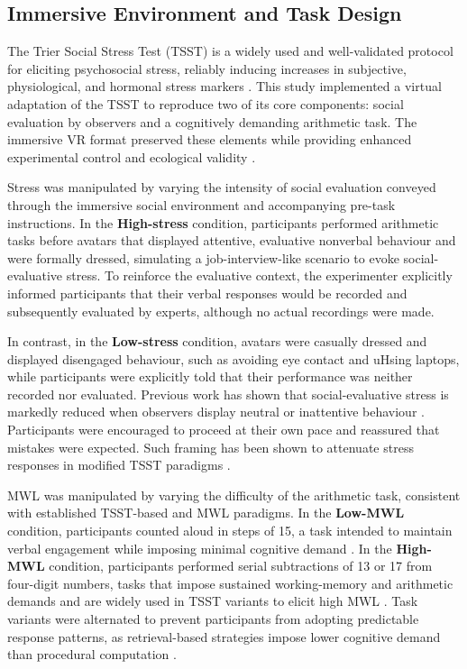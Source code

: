 \documentclass[lettersize,journal]{IEEEtran}
\begin{document}
\subsection{Immersive Environment and Task Design}
\label{sec:immersive_env_task}
The Trier Social Stress Test (TSST) is a widely used and well-validated protocol for eliciting psychosocial stress, reliably inducing increases in subjective, physiological, and hormonal stress markers \cite{goodmanMetaanalyticalAssessmentEffects2017, vanhollebekeNeuralCorrelatesPsychosocial2022a}. This study implemented a virtual adaptation of the TSST to reproduce two of its core components: social evaluation by observers and a cognitively demanding arithmetic task. The immersive VR format preserved these elements while providing enhanced experimental control and ecological validity \cite{helminenStressReactivityTrier2021}.

Stress was manipulated by varying the intensity of social evaluation conveyed through the immersive social environment and accompanying pre-task instructions. In the \textbf{High-stress} condition, participants performed arithmetic tasks before avatars that displayed attentive, evaluative nonverbal behaviour and were formally dressed, simulating a job-interview-like scenario to evoke social-evaluative stress. To reinforce the evaluative context, the experimenter explicitly informed participants that their verbal responses would be recorded and subsequently evaluated by experts, although no actual recordings were made. 

In contrast, in the \textbf{Low-stress} condition, avatars were casually dressed and displayed disengaged behaviour, such as avoiding eye contact and uHsing laptops, while participants were explicitly told that their performance was neither recorded nor evaluated. Previous work has shown that social-evaluative stress is markedly reduced when observers display neutral or inattentive behaviour \cite{yeImpactAudienceDynamics2024}. Participants were encouraged to proceed at their own pace and reassured that mistakes were expected. Such framing has been shown to attenuate stress responses in modified TSST paradigms \cite{wiemersFriendlyVersionTrier2013}.

MWL was manipulated by varying the difficulty of the arithmetic task, consistent with established TSST-based and MWL paradigms. In the \textbf{Low-MWL} condition, participants counted aloud in steps of 15, a task intended to maintain verbal engagement while imposing minimal cognitive demand \cite{guezEffectTrierSocial2016}. In the \textbf{High-MWL} condition, participants performed serial subtractions of 13 or 17 from four-digit numbers, tasks that impose sustained working-memory and arithmetic demands and are widely used in TSST variants to elicit high MWL \cite{giannakakisReviewPsychologicalStress2022}. Task variants were alternated to prevent participants from adopting predictable response patterns, as retrieval-based strategies impose lower cognitive demand than procedural computation \cite{sokolowskiNeuralCorrelatesRetrieval2023}.
\end{document}
